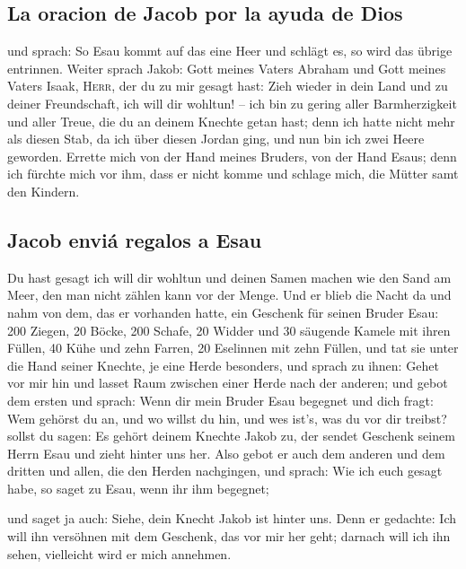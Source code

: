 \hypertarget{la-oracion-de-jacob-por-la-ayuda-de-dios}{%
\subsection{La oracion de Jacob por la ayuda de
Dios}\label{la-oracion-de-jacob-por-la-ayuda-de-dios}}

 und sprach: So Esau kommt auf das eine Heer und schlägt
es, so wird das übrige entrinnen.  Weiter sprach Jakob:
Gott meines Vaters Abraham und Gott meines Vaters Isaak, \textsc{Herr},
der du zu mir gesagt hast: Zieh wieder in dein Land und zu deiner
Freundschaft, ich will dir wohltun! --  ich bin zu gering
aller Barmherzigkeit und aller Treue, die du an deinem Knechte getan
hast; denn ich hatte nicht mehr als diesen Stab, da ich über diesen
Jordan ging, und nun bin ich zwei Heere geworden. 
Errette mich von der Hand meines Bruders, von der Hand Esaus; denn ich
fürchte mich vor ihm, dass er nicht komme und schlage mich, die Mütter
samt den Kindern.

\hypertarget{jacob-enviuxe1-regalos-a-esau}{%
\subsection{Jacob enviá regalos a
Esau}\label{jacob-enviuxe1-regalos-a-esau}}

 Du hast gesagt ich will dir wohltun und deinen Samen
machen wie den Sand am Meer, den man nicht zählen kann vor der Menge.
 Und er blieb die Nacht da und nahm von dem, das er
vorhanden hatte, ein Geschenk für seinen Bruder Esau: 
200 Ziegen, 20 Böcke, 200 Schafe, 20 Widder  und 30
säugende Kamele mit ihren Füllen, 40 Kühe und zehn Farren, 20 Eselinnen
mit zehn Füllen,  und tat sie unter die Hand seiner
Knechte, je eine Herde besonders, und sprach zu ihnen: Gehet vor mir hin
und lasset Raum zwischen einer Herde nach der anderen; 
und gebot dem ersten und sprach: Wenn dir mein Bruder Esau begegnet und
dich fragt: Wem gehörst du an, und wo willst du hin, und wes ist's, was
du vor dir treibst?  sollst du sagen: Es gehört deinem
Knechte Jakob zu, der sendet Geschenk seinem Herrn Esau und zieht hinter
uns her.  Also gebot er auch dem anderen und dem dritten
und allen, die den Herden nachgingen, und sprach: Wie ich euch gesagt
habe, so saget zu Esau, wenn ihr ihm begegnet;

 und saget ja auch: Siehe, dein Knecht Jakob ist hinter
uns. Denn er gedachte: Ich will ihn versöhnen mit dem Geschenk, das vor
mir her geht; darnach will ich ihn sehen, vielleicht wird er mich
annehmen.

